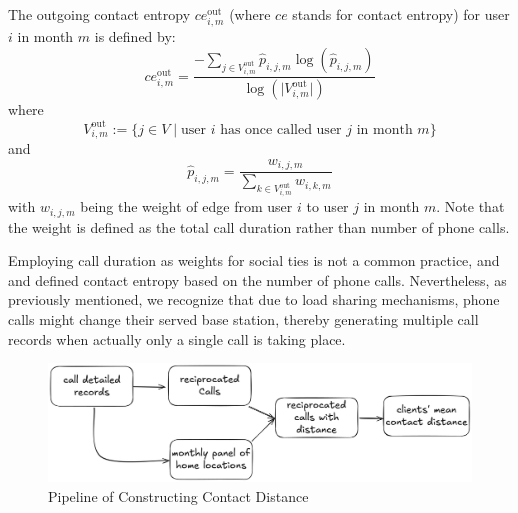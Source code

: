 \begin{definition}
The outgoing contact entropy $ce^{\text{out}}_{i,m}$ (where $ce$ stands for contact entropy) for user $i$ in month $m$ is defined by:
\[
ce^{\text{out}}_{i,m}
=
\frac
{-\sum_{j \in V^{\text{out}}_{i,m}}
\hat{p}_{i,j,m} \log(\hat{p}_{i,j,m})}{\log(\lvert V^\text{out}_{i, m} \rvert )}
\]
where
\begin{equation}\label{eq:outgoing_contacts}
V^{\text{out}}_{i,m}
:=
\{
j \in V
\mid
\text{user } i \text{ has once called user } j \text{ in month } m
\}
\end{equation}
and
\begin{equation}\label{eq:weight_j_for_i_in_month_m}
\hat{p}_{i,j,m}
= \frac{w_{i,j,m}}{\sum_{k \in V^{\text{out}}_{i,m}} w_{i,k,m}}
\end{equation}
with $w_{i,j,m}$ being the weight of edge from user $i$ to user $j$ in month $m$.
Note that the weight is defined as the total call duration rather than number of phone calls.
\end{definition}

Employing call duration as weights for social ties is not a common practice, and \cite{eagle2010network} and \cite{pappalardo2016analytical} defined contact entropy based on the number of phone calls. Nevertheless, as previously mentioned, we recognize that due to load sharing mechanisms, phone calls might change their served base station, thereby generating multiple call records when actually only a single call is taking place.

\begin{figure}[h!]
\centering
\caption{Pipeline of Constructing Contact Distance}
\vspace{0.1cm}

\includegraphics[scale=0.091]{figures/pipeline_mean_contact_distance.png}


\label{fig:pipeline_contact_distance}
\end{figure}

